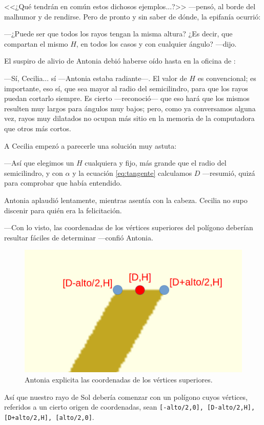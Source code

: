   <<¿Qué tendrán en común estos dichosos ejemplos...?>> \mbox{---pen}\-só, al
  borde del malhumor y de rendirse. Pero de pronto y sin saber de
  dónde, la epifanía ocurrió:

  ---¿Puede ser que todos los rayos tengan la misma altura? ¿Es decir,
  que compartan el mismo $H$, en todos los casos y con cualquier
  ángulo? ---dijo.

  El suspiro de alivio de Antonia debió haberse oído hasta en la
  oficina de \director:

  ---Sí, Cecilia... sí ---Antonia estaba radiante---. El valor de $H$
  es convencional; es importante, eso sí, que sea mayor al radio del
  semicilindro, para que los rayos puedan cortarlo siempre. Es cierto
  ---reconoció--- que eso hará que los mismos resulten muy largos para
  ángulos muy bajos; pero, como ya conversamos alguna vez, rayos muy
  dilatados no ocupan más sitio en la memoria de la computadora que
  otros más cortos.

  A Cecilia empezó a parecerle una solución muy astuta:

  ---Así que elegimos un $H$ cualquiera y fijo, más grande que el
  radio del semicilindro, y con $\alpha$ y la ecuación
  \ref{eq:tangente} calculamos $D$ ---re\-su\-mió, quizá para
  comprobar que había entendido.

  Antonia aplaudió lentamente, mientras asentía con la cabeza. Cecilia
  no supo discenir para quién era la felicitación.

  ---Con lo visto, las coordenadas de los vértices superiores del
  polígono deberían resultar fáciles de determinar ---confió Antonia.


  \begin{figure}[ht]
    \centering
    \includegraphics[width=.65\textwidth]{imagenes/poligono-tapa}    
    \caption{Antonia explicita las coordenadas de los vértices
      superiores.}
    \label{fig:poligono-tapa}
  \end{figure}


  \guillemotright Así que nuestro rayo de Sol debería comenzar con un
  polígono cuyos vértices, referidos a un cierto origen de
  coordenadas, sean \texttt{[-alto/2,0], [D-alto/2,H], [D+alto/2,H],
    [alto/2,0]}.


